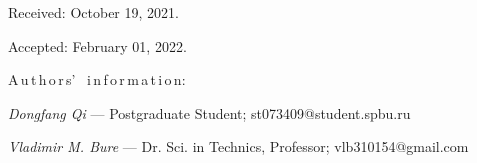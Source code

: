 {\vskip 1.5mm

%


Received:  October 19, 2021.

Accepted: February 01, 2022.

\vskip 6mm


A\,u\,t\,h\,o\,r\,s' \ i\,n\,f\,o\,r\,m\,a\,t\,i\,o\,n:


\vskip 2mm
 \textit{Dongfang Qi} --- Postgraduate Student; st073409@student.spbu.ru \par


\vskip 2mm
 \textit{Vladimir M. Bure} --- Dr. Sci. in Technics, Professor; vlb310154@gmail.com
 \par
%
%
}
